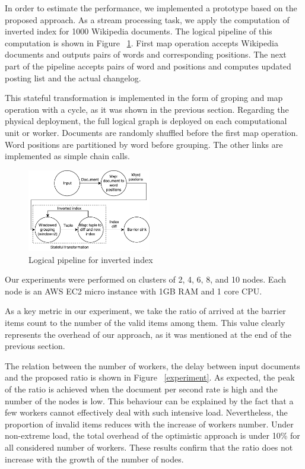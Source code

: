 
\label {fs-experiments}

In order to estimate the performance, we implemented a prototype based on the proposed approach. As a stream processing task, we apply the computation of inverted index for 1000 Wikipedia documents. The logical pipeline of this computation is shown in Figure ~\ref{inverted-index}. First map operation accepts Wikipedia documents and outputs pairs of words and corresponding positions. The next part of the pipeline accepts pairs of word and positions and computes updated posting list and the actual changelog. 

This stateful transformation is implemented in the form of groping and map operation with a cycle, as it was shown in the previous section. Regarding the physical deployment, the full logical graph is deployed on each computational unit or worker. Documents are randomly shuffled before the first map operation. Word positions are partitioned by word before grouping. The other links are implemented as simple chain calls.

\begin{figure}[htbp]
  \centering
  \includegraphics[width=0.48\textwidth]{pics/inverted-index}
  \caption{Logical pipeline for inverted index}
  \label {inverted-index}
\end{figure}

Our experiments were performed on clusters of 2, 4, 6, 8, and 10 nodes. Each node is an AWS EC2 micro instance with 1GB RAM and 1 core CPU.

As a key metric in our experiment, we take the ratio of arrived at the barrier items count to the number of the valid items among them. This value clearly represents the overhead of our approach, as it was mentioned at the end of the previous section. 

The relation between the number of workers, the delay between input documents and the proposed ratio is shown in Figure ~\ref{experiment}. As expected, the peak of the ratio is achieved when the document per second rate is high and the number of the nodes is low. This behaviour can be explained by the fact that a few workers cannot effectively deal with such intensive load. Nevertheless, the proportion of invalid items reduces with the increase of workers number. Under non-extreme load, the total overhead of the optimistic approach is under 10\% for all considered number of workers. These results confirm that the ratio does not increase with the growth of the number of nodes.

